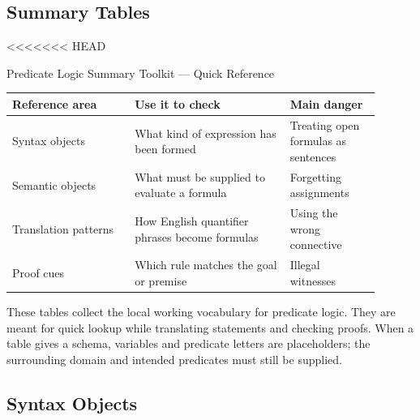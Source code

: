 
\subsection*{Summary Tables}

<<<<<<< HEAD
\begin{toolkitbox}{Predicate Logic Summary Toolkit --- Quick Reference}
\small
\begin{tabular}{p{0.30\linewidth} p{0.38\linewidth} p{0.22\linewidth}}
\toprule
\textbf{Reference area} & \textbf{Use it to check} & \textbf{Main danger} \\
\midrule
Syntax objects & What kind of expression has been formed & Treating open formulas as sentences \\
Semantic objects & What must be supplied to evaluate a formula & Forgetting assignments \\
Translation patterns & How English quantifier phrases become formulas & Using the wrong connective \\
Proof cues & Which rule matches the goal or premise & Illegal witnesses \\
\bottomrule
\end{tabular}
\end{toolkitbox}

\begin{remark*}[Orientation]
These tables collect the local working vocabulary for predicate logic. They
are meant for quick lookup while translating statements and checking proofs.
When a table gives a schema, variables and predicate letters are placeholders;
the surrounding domain and intended predicates must still be supplied.
\end{remark*}

\subsection*{Syntax Objects}

